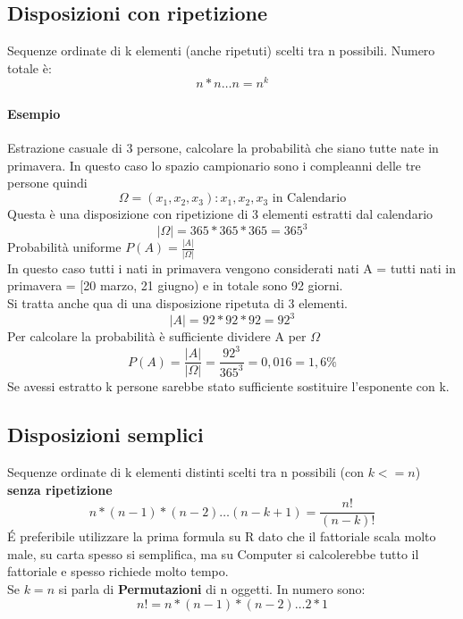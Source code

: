 \documentclass[12pt, a4paper, openany]{book}
\begin{document}
\subsection{Disposizioni con ripetizione}
Sequenze ordinate di k elementi (anche ripetuti) scelti tra n possibili. Numero totale è:
\begin{equation}
    n*n \dots n = n^k
\end{equation}
\paragraph{Esempio} Estrazione casuale di 3 persone, calcolare la probabilità che
siano tutte nate in primavera.
In questo caso lo spazio campionario sono i compleanni delle tre persone quindi
\begin{equation}
    \Omega = {(x_1, x_2, x_3): x_1, x_2, x_3 \text{ in Calendario}}
\end{equation}
Questa è una disposizione con ripetizione di 3 elementi estratti dal calendario
\begin{equation}
    |\Omega| = 365*365*365 = 365^3
\end{equation}
Probabilità uniforme $P(A) = \frac{|A|}{|\Omega|}$
\\ In questo caso tutti i nati in primavera vengono considerati 
nati A = tutti  nati in primavera = [20 marzo, 21 giugno) e in totale sono 92 giorni.
\\ Si tratta anche qua di una disposizione ripetuta di 3 elementi.
\begin{equation}
    |A| = 92*92*92 = 92^3
\end{equation}
Per calcolare la probabilità è sufficiente dividere A per $\Omega$
\begin{equation}
    P(A) = \frac{|A|}{|\Omega|} = \frac{92^3}{365^3} = 0,016 = 1,6\%
\end{equation}
Se avessi estratto k persone sarebbe stato sufficiente sostituire l'esponente con k.

\subsection{Disposizioni semplici}
Sequenze ordinate di k elementi distinti scelti tra n possibili (con $k <= n$) 
\textbf{senza ripetizione}
\begin{equation}
    n*(n-1)*(n-2)\dots(n-k+1) = \frac{n!}{(n-k)!}
\end{equation}
\'E preferibile utilizzare la prima formula su R dato che il fattoriale scala molto male,
su carta spesso si semplifica, ma su Computer si calcolerebbe tutto il fattoriale e spesso richiede 
molto tempo.
\\ Se $k = n$ si parla di \textbf{Permutazioni} di n oggetti. In numero sono:
\begin{equation}
    n! = n*(n-1)*(n-2)\dots 2 * 1
\end{equation}
\end{document}
